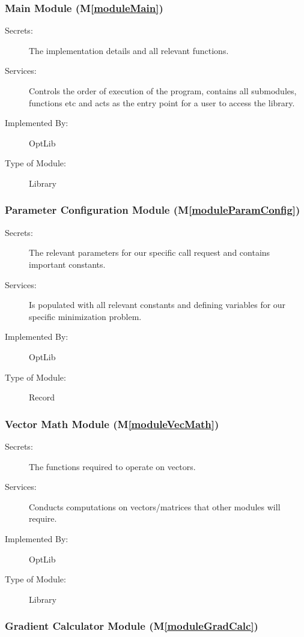 \documentclass[12pt, titlepage]{article}
\newcommand{\mref}[1]{M\ref{#1}}
\begin{document}
\subsubsection{Main Module (\mref{moduleMain})}

\begin{description}
\item[Secrets:]The implementation details and all relevant functions.
\item[Services:]Controls the order of execution of the program, contains all submodules, functions etc and acts as the entry point for a user to access the library.
\item[Implemented By:] OptLib
\item[Type of Module:] Library
\end{description}

\subsubsection{Parameter Configuration Module (\mref{moduleParamConfig})}

\begin{description}
\item[Secrets:]The relevant parameters for our specific call request and contains important constants.
\item[Services:]Is populated with all relevant constants and defining variables for our specific minimization problem.
\item[Implemented By:] OptLib
\item[Type of Module:] Record
\end{description}

\subsubsection{Vector Math Module (\mref{moduleVecMath})}

\begin{description}
\item[Secrets:]The functions required to operate on vectors.
\item[Services:]Conducts computations on vectors/matrices that other modules will require.
\item[Implemented By:] OptLib
\item[Type of Module:] Library
\end{description}

\subsubsection{Gradient Calculator Module (\mref{moduleGradCalc})}
\end{document}

